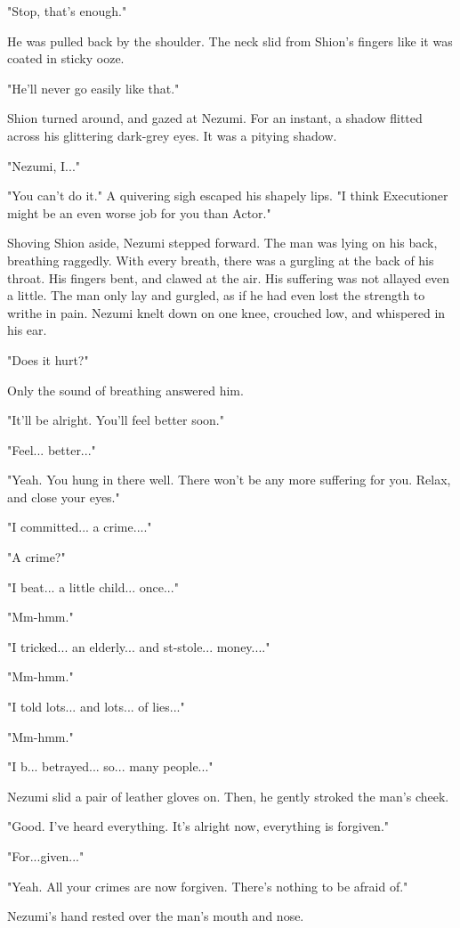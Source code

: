 "Stop, that's enough."

He was pulled back by the shoulder. The neck slid from Shion's fingers
like it was coated in sticky ooze.

"He'll never go easily like that."

Shion turned around, and gazed at Nezumi. For an instant, a shadow
flitted across his glittering dark-grey eyes. It was a pitying shadow.

"Nezumi, I..."

"You can't do it." A quivering sigh escaped his shapely lips. "I think
Executioner might be an even worse job for you than Actor."

Shoving Shion aside, Nezumi stepped forward. The man was lying on his
back, breathing raggedly. With every breath, there was a gurgling at the
back of his throat. His fingers bent, and clawed at the air. His
suffering was not allayed even a little. The man only lay and gurgled,
as if he had even lost the strength to writhe in pain. Nezumi knelt down
on one knee, crouched low, and whispered in his ear.

"Does it hurt?"

Only the sound of breathing answered him.

"It'll be alright. You'll feel better soon."

"Feel... better..."

"Yeah. You hung in there well. There won't be any more suffering for
you. Relax, and close your eyes."

"I committed... a crime...."

"A crime?"

"I beat... a little child... once..."

"Mm-hmm."

"I tricked... an elderly... and st-stole... money...."

"Mm-hmm."

"I told lots... and lots... of lies..."

"Mm-hmm."

"I b... betrayed... so... many people..."

Nezumi slid a pair of leather gloves on. Then, he gently stroked the
man's cheek.

"Good. I've heard everything. It's alright now, everything is forgiven."

"For...given..."

"Yeah. All your crimes are now forgiven. There's nothing to be afraid
of."

Nezumi's hand rested over the man's mouth and nose.

